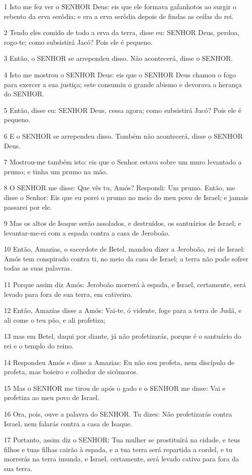 \par 1 Isto me fez ver o SENHOR Deus: eis que ele formava gafanhotos ao surgir o rebento da erva serôdia; e era a erva serôdia depois de findas as ceifas do rei.
\par 2 Tendo eles comido de todo a erva da terra, disse eu: SENHOR Deus, perdoa, rogo-te; como subsistirá Jacó? Pois ele é pequeno.
\par 3 Então, o SENHOR se arrependeu disso. Não acontecerá, disse o SENHOR.
\par 4 Isto me mostrou o SENHOR Deus: eis que o SENHOR Deus chamou o fogo para exercer a sua justiça; este consumiu o grande abismo e devorava a herança do SENHOR.
\par 5 Então, disse eu: SENHOR Deus, cessa agora; como subsistirá Jacó? Pois ele é pequeno.
\par 6 E o SENHOR se arrependeu disso. Também não acontecerá, disse o SENHOR Deus.
\par 7 Mostrou-me também isto: eis que o Senhor estava sobre um muro levantado a prumo; e tinha um prumo na mão.
\par 8 O SENHOR me disse: Que vês tu, Amós? Respondi: Um prumo. Então, me disse o Senhor: Eis que eu porei o prumo no meio do meu povo de Israel; e jamais passarei por ele.
\par 9 Mas os altos de Isaque serão assolados, e destruídos, os santuários de Israel; e levantar-me-ei com a espada contra a casa de Jeroboão.
\par 10 Então, Amazias, o sacerdote de Betel, mandou dizer a Jeroboão, rei de Israel: Amós tem conspirado contra ti, no meio da casa de Israel; a terra não pode sofrer todas as suas palavras.
\par 11 Porque assim diz Amós: Jeroboão morrerá à espada, e Israel, certamente, será levado para fora de sua terra, em cativeiro.
\par 12 Então, Amazias disse a Amós: Vai-te, ó vidente, foge para a terra de Judá, e ali come o teu pão, e ali profetiza;
\par 13 mas em Betel, daqui por diante, já não profetizarás, porque é o santuário do rei e o templo do reino.
\par 14 Respondeu Amós e disse a Amazias: Eu não sou profeta, nem discípulo de profeta, mas boieiro e colhedor de sicômoros.
\par 15 Mas o SENHOR me tirou de após o gado e o SENHOR me disse: Vai e profetiza ao meu povo de Israel.
\par 16 Ora, pois, ouve a palavra do SENHOR. Tu dizes: Não profetizarás contra Israel, nem falarás contra a casa de Isaque.
\par 17 Portanto, assim diz o SENHOR: Tua mulher se prostituirá na cidade, e teus filhos e tuas filhas cairão à espada, e a tua terra será repartida a cordel, e tu morrerás na terra imunda, e Israel, certamente, será levado cativo para fora da sua terra.

